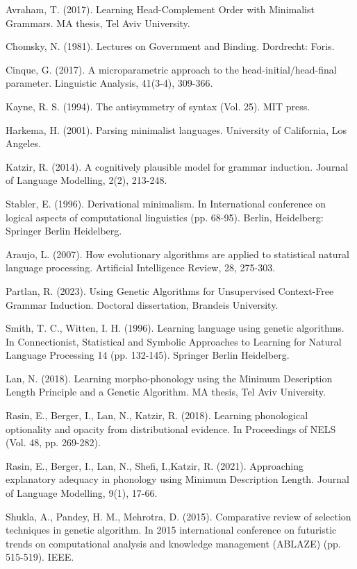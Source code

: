 \documentclass{article}
\begin{document}
\begin{thebibliography}{} %

Avraham, T. (2017). 
Learning Head-Complement Order with Minimalist Grammars.
MA thesis, Tel Aviv University.

Chomsky, N. (1981). 
Lectures on Government and Binding.
Dordrecht: Foris.

Cinque, G. (2017). 
A microparametric approach to the head-initial/head-final parameter. 
Linguistic Analysis, 41(3-4), 309-366.

Kayne, R. S. (1994). 
The antisymmetry of syntax (Vol. 25). 
MIT press.

Harkema, H. (2001). 
Parsing minimalist languages. 
University of California, Los Angeles.

Katzir, R. (2014). 
A cognitively plausible model for grammar induction. 
Journal of Language Modelling, 2(2), 213-248.

Stabler, E. (1996). 
Derivational minimalism. In International conference on logical aspects of computational linguistics (pp. 68-95). 
Berlin, Heidelberg: Springer Berlin Heidelberg.

Araujo, L. (2007). 
How evolutionary algorithms are applied to statistical natural language processing. 
Artificial Intelligence Review, 28, 275-303.

Partlan, R. (2023). 
Using Genetic Algorithms for Unsupervised Context-Free Grammar Induction.
Doctoral dissertation, Brandeis University.

Smith, T. C.,  Witten, I. H. (1996). 
Learning language using genetic algorithms. 
In Connectionist, Statistical and Symbolic Approaches to Learning for Natural Language Processing 14 (pp. 132-145). Springer Berlin Heidelberg.

Lan, N. (2018). 
Learning morpho-phonology using the Minimum Description Length Principle and a Genetic Algorithm.
MA thesis, Tel Aviv University.

Rasin, E., Berger, I., Lan, N.,  Katzir, R. (2018). 
Learning phonological optionality and opacity from distributional evidence. 
In Proceedings of NELS (Vol. 48, pp. 269-282).

Rasin, E., Berger, I., Lan, N., Shefi, I.,Katzir, R. (2021). 
Approaching explanatory adequacy in phonology using Minimum Description Length. 
Journal of Language Modelling, 9(1), 17-66.

Shukla, A., Pandey, H. M., Mehrotra, D. (2015). 
Comparative review of selection techniques in genetic algorithm. 
In 2015 international conference on futuristic trends on computational analysis and knowledge management (ABLAZE) (pp. 515-519). IEEE.


\end{thebibliography}
\end{document}
